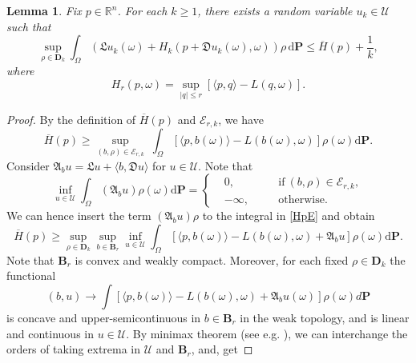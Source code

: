 \documentclass[11pt,reqno]{amsart}
\newtheorem{lem}[thm]{Lemma}
\theoremstyle{definition}
\theoremstyle{remark}
\numberwithin{equation}{section}
\begin{document}
\begin{lem}
Fix $p\in\mathbb{R}^n$. For each $k \geq 1$, there exists a random variable $u_{k} \in \mathscr{U}$ such that
\begin{equation}\label{UpE1}
    \sup_{\rho\in\mathbf{D}_{k}}\int_{\Omega}(\mathfrak{L} u_{k} (\omega) + H_{k}(p + \mathfrak{D} u_{k}(\omega), \omega))\rho \,\mathrm{d}\mathbf{P} \leq \overline{H}(p) +\frac{1}{k},
\end{equation}
where 
\begin{equation*}
    H_{r}(p,\omega)=\sup_{|q|\leq r}[\langle p, q \rangle - L(q,\omega)].
\end{equation*}
\end{lem}
\begin{proof}
By the definition of $\overline{H}(p)$ and $\mathscr{E}_{r,k}$, we have
\begin{equation}\label{HpE}
    \overline{H}(p) \geq \sup_{(b,\rho)\in\mathscr{E}_{r,k}}\;\int_{\Omega} [\langle p,b(\omega)\rangle - L(b(\omega),\omega)]\rho(\omega) \mathrm{d}\mathbf{P}.
\end{equation}
Consider $\mathfrak{A}_{b}u = \mathfrak{L}u + \langle b, \mathfrak{D} u \rangle$ for $u\in \mathscr{U}$. Note that
\begin{equation*}
  \inf_{u\in \mathscr{U}}\int_{\Omega} (\mathfrak{A}_{b}u)\rho(\omega) \mathrm{d}\mathbf{P}= \left\{
   \begin{aligned}
   & 0,\quad & &\text{if}\ (b,\rho) \in \mathscr{E}_{r,k}, \\
   & -\infty, \quad & &\text{otherwise}.
   \end{aligned}
   \right.
\end{equation*}
We can hence insert the term $(\mathfrak{A}_bu)\rho$ to the integral in \eqref{HpE} and obtain
\begin{equation*}
    \overline{H}(p) \geq \sup_{\rho \in \mathbf{D}_{k}}\sup_{b\in \mathbf{B}_{r}}\inf_{u\in \mathscr{U}} \int_{\Omega} [\langle p,b(\omega)\rangle - L(b(\omega),\omega) + \mathfrak{A}_bu]\rho(\omega) \mathrm{d}\mathbf{P}.
\end{equation*}
Note that $\mathbf{B}_{r}$ is convex and weakly compact. Moreover, for each fixed $\rho \in \mathbf{D}_{k}$ the functional
\begin{equation*}
    (b,u) \rightarrow \int [\langle p,b(\omega)\rangle - L(b(\omega),\omega)+ \mathfrak{A}_bu(\omega)]\rho(\omega) d\mathbf{P}
\end{equation*}    
is concave and upper-semicontinuous in $b\in \mathbf{B}_{r}$ in the weak topology, and is linear and continuous in $u\in\mathscr{U}$. By minimax theorem (see e.g. \cite{S1958}), we can interchange the orders of taking extrema in $\mathscr{U}$ and $\mathbf{B}_{r}$, and, get

\end{proof}
\end{document}

